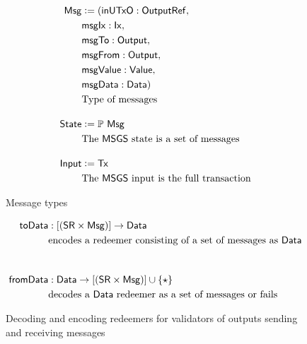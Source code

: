\begin{figure}
  \begin{align*}
    \Msg &\leteq ( \fun{inUTxO}: \OutputRef,\\
    & \fun{msgIx}: \Ix, \\
    & \fun{msgTo}: \Output,\\
    & \fun{msgFrom}: \Output,\\
    & \fun{msgValue}: \Value,\\
    & \fun{msgData}: \Data ) \\
    & \text{Type of messages}
    \nextdef
    \State &\leteq \powerset{\Msg} \\
    & \text{The $\MSGS$ state is a set of messages}
    \nextdef
    \Input &\leteq \Tx \\
    & \text{The $\MSGS$ input is the full transaction}
  \end{align*}
\caption{Message types}
\label{fig:msgs-types}
\end{figure}

\begin{figure}
  \begin{align*}
  \fun{toData} &: [(\SR \times \Msg)] \to \Data \\
  &\text{encodes a redeemer consisting of a set of messages as $\Data$} \\
  \nextdef
  \fun{fromData} &: \Data \to [(\SR \times \Msg)] \cup \{\emptytype \} \\
  &\text{decodes a $\Data$ redeemer as a set of messages or fails} \\
  \end{align*}
\caption{Decoding and encoding redeemers for validators of outputs sending and receiving messages}
\label{fig:msg-to}
\end{figure}

